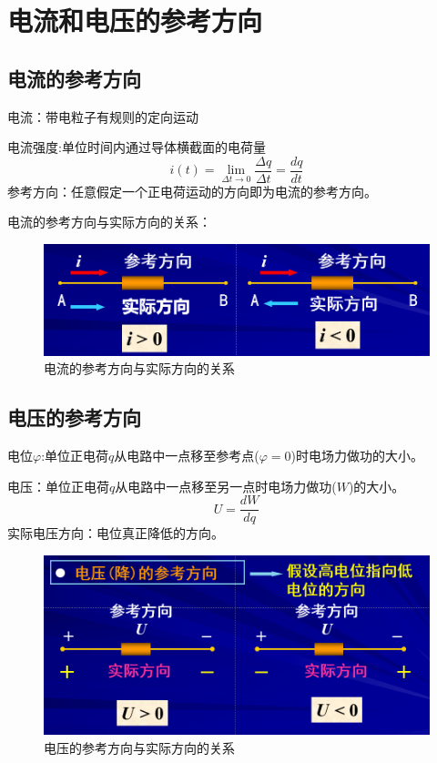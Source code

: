 \documentclass[11pt,a4paper,oneside]{book}
\begin{document}
\section{电流和电压的参考方向}
\subsection{电流的参考方向}
电流：带电粒子有规则的定向运动

电流强度:单位时间内通过导体横截面的电荷量
\begin{equation}
	i(t)=\lim_{\Delta t \rightarrow 0} \frac{\Delta q}{\Delta t}=\frac{dq}{dt}
\end{equation}
参考方向：任意假定一个正电荷运动的方向即为电流的参考方向。

电流的参考方向与实际方向的关系：
\begin{figure}[H]
	\centering
	\includegraphics[width=0.7\linewidth]{screenshot107}
	\caption{电流的参考方向与实际方向的关系}
	\label{fig:screenshot107}
\end{figure}
\subsection{电压的参考方向}
电位$\varphi$:单位正电荷$q$从电路中一点移至参考点($\varphi=0$)时电场力做功的大小。

电压：单位正电荷$q$从电路中一点移至另一点时电场力做功($W$)的大小。
\begin{equation}
	U=\frac{dW}{dq}
\end{equation}
实际电压方向：电位真正降低的方向。
\begin{figure}[H]
	\centering
	\includegraphics[width=0.7\linewidth]{screenshot108}
	\caption{电压的参考方向与实际方向的关系}
	\label{fig:screenshot108}
\end{figure}
\end{document}
